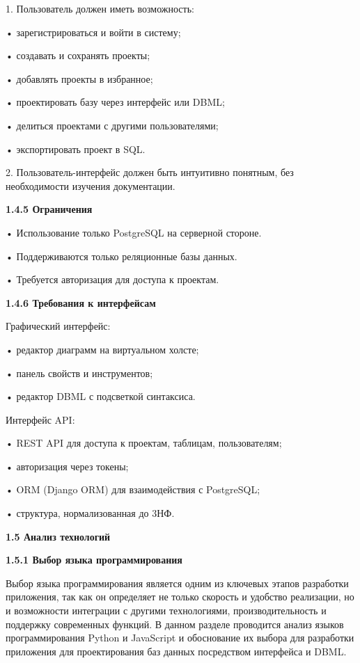 	1.	Пользователь должен иметь возможность:
    
	•	зарегистрироваться и войти в систему;
    
	•	создавать и сохранять проекты;
    
	•	добавлять проекты в избранное;
    
	•	проектировать базу через интерфейс или DBML;
    
	•	делиться проектами с другими пользователями;
    
	•	экспортировать проект в SQL.
    
	2.	Пользователь-интерфейс должен быть интуитивно понятным, без необходимости изучения документации.

\textbf{\large 1.4.5 Ограничения}

	•	Использование только PostgreSQL на серверной стороне.
    
	•	Поддерживаются только реляционные базы данных.
    
	•	Требуется авторизация для доступа к проектам.


\textbf{\large 1.4.6 Требования к интерфейсам}

	Графический интерфейс:
    
	•	редактор диаграмм на виртуальном холсте;
    
	•	панель свойств и инструментов;
    
	•	редактор DBML с подсветкой синтаксиса.
    
	Интерфейс API:
    
	•	REST API для доступа к проектам, таблицам, пользователям;
    
	•	авторизация через токены;
    
	•	ORM (Django ORM) для взаимодействия с PostgreSQL;
    
	•	структура, нормализованная до 3НФ.


\textbf{\large 1.5 Анализ технологий}

\textbf{\large 1.5.1 Выбор языка программирования}

Выбор языка программирования является одним из ключевых этапов
разработки приложения, так как он определяет не только скорость и удобство
реализации, но и возможности интеграции с другими технологиями, производительность и поддержку современных функций. В данном разделе проводится анализ языков программирования Python и JavaScript и обоснование их выбора для разработки приложения для проектирования баз данных посредством интерфейса и DBML.

